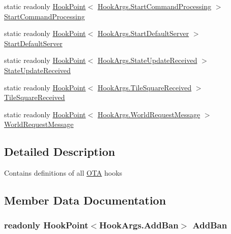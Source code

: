 \begin{DoxyCompactItemize}
static readonly \hyperlink{classOTA_1_1Plugin_1_1HookPoint}{Hook\+Point}$<$ \hyperlink{structOTA_1_1Plugin_1_1HookArgs_1_1StartCommandProcessing}{Hook\+Args.\+Start\+Command\+Processing} $>$ \hyperlink{classOTA_1_1Plugin_1_1HookPoints_a83400cd0a9f26866c7e5b9acbaf1536f}{Start\+Command\+Processing}
\item 
static readonly \hyperlink{classOTA_1_1Plugin_1_1HookPoint}{Hook\+Point}$<$ \hyperlink{structOTA_1_1Plugin_1_1HookArgs_1_1StartDefaultServer}{Hook\+Args.\+Start\+Default\+Server} $>$ \hyperlink{classOTA_1_1Plugin_1_1HookPoints_a9c2e8dbae17dc3798934e8cdd40cb1db}{Start\+Default\+Server}
\item 
static readonly \hyperlink{classOTA_1_1Plugin_1_1HookPoint}{Hook\+Point}$<$ \hyperlink{structOTA_1_1Plugin_1_1HookArgs_1_1StateUpdateReceived}{Hook\+Args.\+State\+Update\+Received} $>$ \hyperlink{classOTA_1_1Plugin_1_1HookPoints_a62abf7a39a0fd348b58d2546b5646f21}{State\+Update\+Received}
\item 
static readonly \hyperlink{classOTA_1_1Plugin_1_1HookPoint}{Hook\+Point}$<$ \hyperlink{structOTA_1_1Plugin_1_1HookArgs_1_1TileSquareReceived}{Hook\+Args.\+Tile\+Square\+Received} $>$ \hyperlink{classOTA_1_1Plugin_1_1HookPoints_ac32c3b19a84c675b4b9f45cdc66edf41}{Tile\+Square\+Received}
\item 
static readonly \hyperlink{classOTA_1_1Plugin_1_1HookPoint}{Hook\+Point}$<$ \hyperlink{structOTA_1_1Plugin_1_1HookArgs_1_1WorldRequestMessage}{Hook\+Args.\+World\+Request\+Message} $>$ \hyperlink{classOTA_1_1Plugin_1_1HookPoints_ad7748c9d7ff039435cd147429c008e16}{World\+Request\+Message}
\end{DoxyCompactItemize}


\subsection{Detailed Description}
Contains definitions of all \hyperlink{namespaceOTA}{O\+T\+A} hooks 



\subsection{Member Data Documentation}
\hypertarget{classOTA_1_1Plugin_1_1HookPoints_a45ef72db25782e1b6742db9781130a6d}{}
\subsubsection[{Add\+Ban}]{\setlength{\rightskip}{0pt plus 5cm}readonly {\bf Hook\+Point}$<${\bf Hook\+Args.\+Add\+Ban}$>$ Add\+Ban\hspace{0.3cm}{\ttfamily [static]}}\label{classOTA_1_1Plugin_1_1HookPoints_a45ef72db25782e1b6742db9781130a6d}
\hypertarget{classOTA_1_1Plugin_1_1HookPoints_a44936c5e2c7e5fb2c4961744fecdbde6}{}
